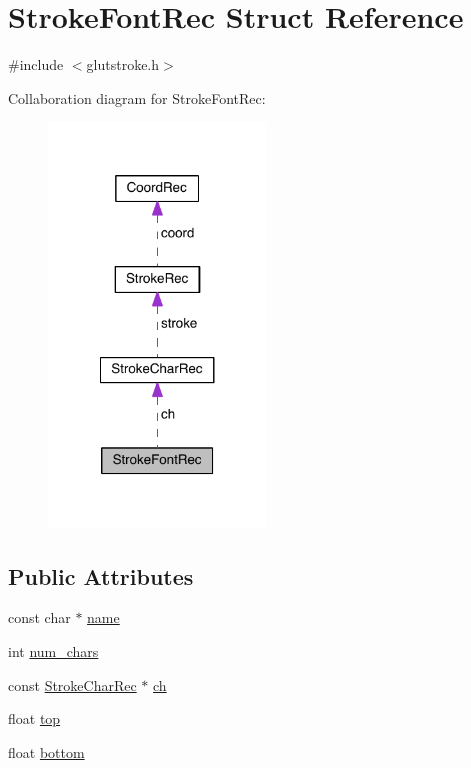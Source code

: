 \hypertarget{struct_stroke_font_rec}{\section{Stroke\-Font\-Rec Struct Reference}
\label{struct_stroke_font_rec}
}


{\ttfamily \#include $<$glutstroke.\-h$>$}



Collaboration diagram for Stroke\-Font\-Rec\-:
\nopagebreak
\begin{figure}[H]
\begin{center}
\leavevmode
\includegraphics[width=164pt]{struct_stroke_font_rec__coll__graph}
\end{center}
\end{figure}
\subsection*{Public Attributes}
\begin{DoxyCompactItemize}
\item 
const char $\ast$ \hyperlink{struct_stroke_font_rec_a1fe6bcef9b9e4b7c7391ab657d9cd007}{name}
\item 
int \hyperlink{struct_stroke_font_rec_ab1fcdca4dff8f9ee75380be317b21d04}{num\-\_\-chars}
\item 
const \hyperlink{struct_stroke_char_rec}{Stroke\-Char\-Rec} $\ast$ \hyperlink{struct_stroke_font_rec_a07946756718622d269df344616d77180}{ch}
\item 
float \hyperlink{struct_stroke_font_rec_a279e56b7237add8c30e49c83c1be883a}{top}
\item 
float \hyperlink{struct_stroke_font_rec_a9a33680d3752e89196d184a930a809c3}{bottom}
\end{DoxyCompactItemize}


